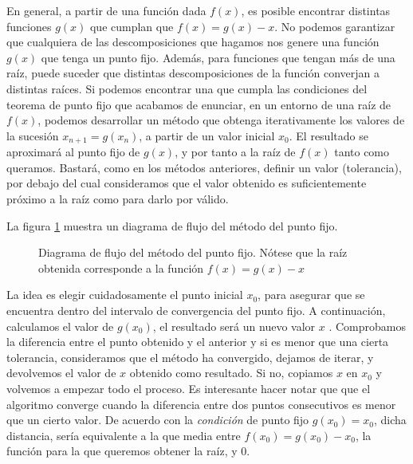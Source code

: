 En general, a partir de una función dada $f(x)$, es posible encontrar distintas funciones $g(x)$ que cumplan que $f(x)=g(x)-x$. No podemos garantizar que cualquiera de las descomposiciones que hagamos nos genere una función $g(x)$ que tenga un punto fijo. 
Además, para funciones que tengan más de una raíz, puede suceder que distintas descomposiciones de la función converjan a distintas raíces.
Si podemos encontrar una que cumpla las condiciones del teorema de punto fijo que acabamos de enunciar, en un entorno de una raíz de $f(x)$, podemos desarrollar un método que obtenga iterativamente los valores de la sucesión   $x_{n+1}=g(x_n)$, a partir de un valor inicial $x_0$.  El resultado se aproximará al punto fijo de $g(x)$, y por tanto a la raíz de $f(x)$ tanto como queramos. Bastará, como   en los métodos anteriores, definir un valor (tolerancia), por debajo del cual consideramos que el valor obtenido es suficientemente próximo a  la raíz como para darlo por válido. 

La figura \ref{fig:pfijo1} muestra un diagrama de flujo del método del punto fijo. 


\begin{figure}[h]
\centering
{}
\caption{Diagrama de flujo del método del punto fijo. Nótese que la raíz obtenida corresponde a la función $f(x)=g(x)-x$}
\label{fig:pfijo1}
\end{figure}

 La idea es elegir cuidadosamente el punto inicial $x_0$, para asegurar que se encuentra dentro del intervalo de convergencia del punto fijo.  A continuación, calculamos el valor de $g(x_0)$, el resultado será un nuevo valor  $x$ .  Comprobamos la diferencia entre el punto obtenido y el anterior y si es menor que una cierta tolerancia,  consideramos que el método ha convergido, dejamos de iterar, y devolvemos el valor de $x$ obtenido como resultado. Si no, copiamos $x$ en $x_0$ y volvemos a empezar todo el proceso. Es interesante hacer notar que que el algoritmo converge cuando la diferencia entre dos puntos consecutivos es menor que un cierto valor.  De acuerdo con la \emph{condición } de punto fijo $g(x_0)=x_0$, dicha distancia, sería equivalente a la que media entre $f(x_0)=g(x_0)-x_0$, la función para la que queremos obtener la raíz,   y $0$.

